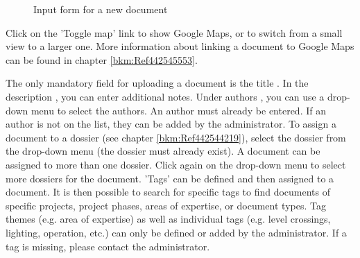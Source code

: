 \begin{figure}[H]
\caption{Input form for a new document}
\end{figure}

Click on the 'Toggle map' link  to show Google Maps, or to switch from a small view to a larger one. More information about linking a document to Google Maps can be found in chapter \ref{bkm:Ref442545553}. \newline

The only mandatory field for uploading a document is the title . In the description , you can enter additional notes. Under authors , you can use a drop-down menu to select the authors. An author must already be entered. If an author is not on the list, they can be added by the administrator. To assign a document to a dossier (see chapter \ref{bkm:Ref442544219}), select the dossier from the drop-down menu  (the dossier must already exist). A document can be assigned to more than one dossier. Click again on the drop-down menu to select more dossiers for the document. 'Tags'  can be defined and then assigned to a document. It is then possible to search for specific tags to find documents of specific projects, project phases, areas of expertise, or document types. Tag themes (e.g. area of expertise) as well as individual tags (e.g. level crossings, lighting, operation, etc.) can only be defined or added by the administrator. If a tag is missing, please contact the administrator. \newline


